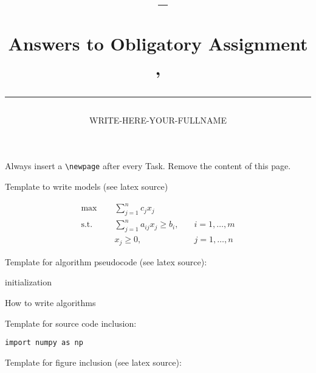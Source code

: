 \documentclass[a4paper,10pt]{article}
\author{WRITE-HERE-YOUR-FULLNAME}
\title{\begin{flushleft}
\vspace{-4ex}
\courseid~-- \coursename \\[0.2cm]
{\Large Answers to Obligatory Assignment \assnr, \term \\[3ex]
\hrule}
\end{flushleft}
}
\date{}
\begin{document}
\maketitle





Always insert a \verb=\newpage= after every Task.
Remove the content of this page.

\bigskip
\bigskip

Template to write models (see latex source)

\begin{align}
   \label{ob} \max \; \quad & \sum_{j=1}^nc_jx_j  \\
   \label{c1} \mbox{s.t.} \quad &\sum\limits_{j=1}^n a_{ij}x_j\geq b_i,
   & \quad i=1,\ldots,m \\
\label{c2}   &x_j \geq 0, & \quad j=1,\ldots,n   
\end{align}

Template for algorithm pseudocode (see latex source):

\begin{algorithm}[htb]
 initialization\;
 \caption{How to write algorithms}
\end{algorithm}


\bigskip
\bigskip
Template for source code inclusion:

\begin{lstlisting}
import numpy as np

\end{lstlisting}

Template for figure inclusion (see latex source):

\begin{figure}[htb]
\begin{center}
\end{center}
\end{figure}
\end{document}
